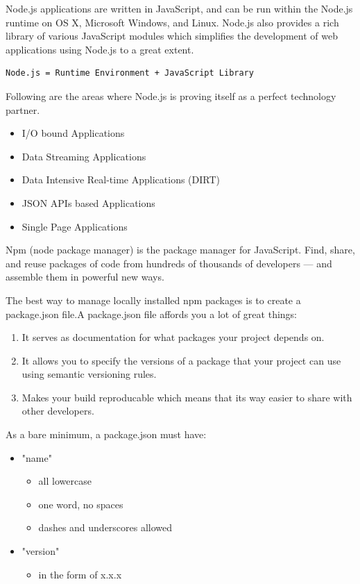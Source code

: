 \documentclass[a4paper, 12pt]{book}
\begin{document}
Node.js applications are written in JavaScript, and can be run within the Node.js runtime on OS X, Microsoft Windows, and Linux. Node.js also provides a rich library of various JavaScript modules which simplifies the development of web applications using Node.js to a great extent.

\begin{lstlisting}[frame=single]
Node.js = Runtime Environment + JavaScript Library
\end{lstlisting}

Following are the areas where Node.js is proving itself as a perfect technology partner.
\begin{itemize}
\item I/O bound Applications
\item Data Streaming Applications
\item Data Intensive Real-time Applications (DIRT)
\item JSON APIs based Applications
\item Single Page Applications
\end{itemize}


Npm (node package manager) is the package manager for JavaScript. Find, share, and reuse packages of code from hundreds of thousands of developers — and assemble them in powerful new ways. 

The best way to manage locally installed npm packages is to create a package.json file.A package.json file affords you a lot of great things:
\begin{enumerate}
\item It serves as documentation for what packages your project depends on.
\item It allows you to specify the versions of a package that your project can use using semantic versioning rules.
\item Makes your build reproducable which means that its way easier to share with other developers.
\end{enumerate}

As a bare minimum, a package.json must have:
\begin{itemize}
\item "name"
\begin{itemize}
\item all lowercase
\item one word, no spaces
\item dashes and underscores allowed
\end{itemize}
\item "version"
\begin{itemize}
\item in the form of x.x.x
\end{itemize}
\end{itemize}
\end{document}
